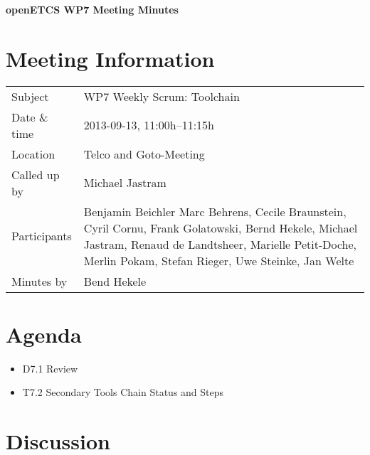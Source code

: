 \documentclass[a4paper, 11pt]{article}
\begin{document}
{\begin{center}\huge\bf openETCS WP7 Meeting Minutes\end{center}}
\section{Meeting Information}

\renewcommand{\arraystretch}{1.5}
\begin{supertabular}{m{.2\textwidth}m{.8\textwidth}}
Subject & WP7 Weekly Scrum: Toolchain\\
Date \& time & 2013-09-13, 11:00h--11:15h\\
Location & Telco and Goto-Meeting\\
Called up by & Michael Jastram\\
Participants &
Benjamin Beichler
Marc Behrens,
Cecile Braunstein,
Cyril Cornu,
Frank Golatowski,
Bernd Hekele,
Michael Jastram,
Renaud de Landtsheer,
Marielle Petit-Doche,
Merlin Pokam,
Stefan Rieger,
Uwe Steinke,
Jan Welte\\


Minutes by & Bend Hekele\\

\end{supertabular}
\renewcommand{\arraystretch}{1.0}


\section{Agenda}
\begin{itemize}
\item D7.1 Review
\item T7.2 Secondary Tools Chain Status and Steps
\end{itemize}

\section{Discussion}
\end{document}
